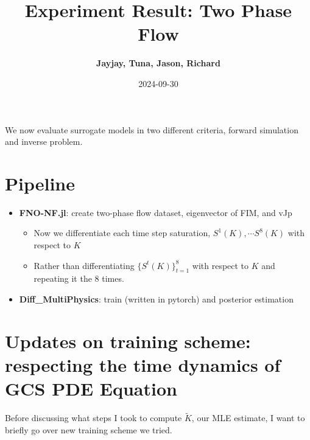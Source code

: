 \documentclass[
]{article}
\title{Experiment Result: Two Phase Flow}
\author{\textbf{Jayjay, Tuna, Jason, Richard}\\}
\date{2024-09-30}
\providecommand{\tightlist}{%
  \setlength{\itemsep}{0pt}\setlength{\parskip}{0pt}}\usepackage{longtable,booktabs,array}
\begin{document}
\maketitle


We now evaluate surrogate models in two different criteria, forward
simulation and inverse problem.

\section{Pipeline}\label{pipeline}

\begin{itemize}
\tightlist
\item
  \textbf{FNO-NF.jl}: create two-phase flow dataset, eigenvector of FIM,
  and vJp

  \begin{itemize}
  \tightlist
  \item
    Now we differentiate each time step saturation,
    \(S^1(K), \cdots S^8(K)\) with respect to \(K\)
  \item
    Rather than differentiating \(\{S^t(K)\}_{t=1}^8\) with respect to
    \(K\) and repeating it the 8 times.
  \end{itemize}
\item
  \textbf{Diff\_MultiPhysics}: train (written in pytorch) and posterior
  estimation
\end{itemize}

\section{Updates on training scheme: respecting the time dynamics of GCS
PDE
Equation}\label{updates-on-training-scheme-respecting-the-time-dynamics-of-gcs-pde-equation}

Before discussing what steps I took to compute \(\tilde K\), our MLE
estimate, I want to briefly go over new training scheme we tried.
\end{document}
